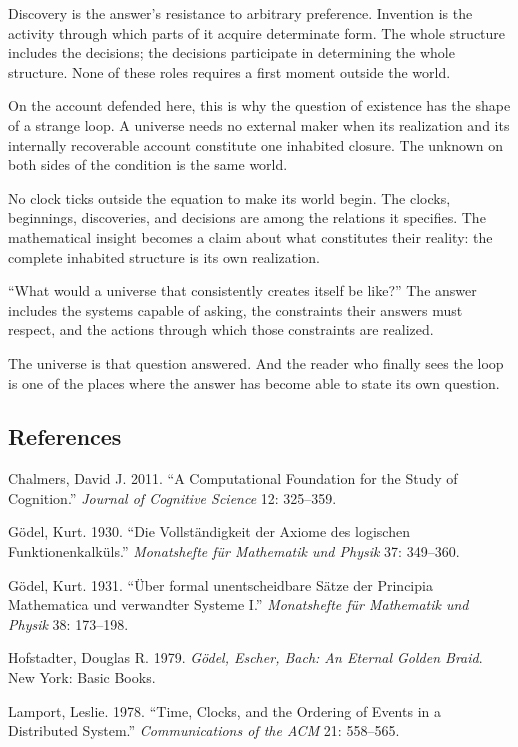 \documentclass[
  11pt,
]{article}
\begin{document}
Discovery is the answer's resistance to arbitrary preference. Invention
is the activity through which parts of it acquire determinate form. The
whole structure includes the decisions; the decisions participate in
determining the whole structure. None of these roles requires a first
moment outside the world.

On the account defended here, this is why the question of existence has
the shape of a strange loop. A universe needs no external maker when its
realization and its internally recoverable account constitute one
inhabited closure. The unknown on both sides of the condition is the
same world.

No clock ticks outside the equation to make its world begin. The clocks,
beginnings, discoveries, and decisions are among the relations it
specifies. The mathematical insight becomes a claim about what
constitutes their reality: the complete inhabited structure is
its own realization.

``What would a universe that consistently creates itself be like?'' The
answer includes the systems capable of asking, the constraints their
answers must respect, and the actions through which those constraints
are realized.

The universe is that question answered. And the reader who finally sees
the loop is one of the places where the answer has become able to state
its own question.

\subsection{References}\label{references}

Chalmers, David J. 2011. ``A Computational Foundation for the Study of
Cognition.'' \emph{Journal of Cognitive Science} 12: 325--359.

Gödel, Kurt. 1930. ``Die Vollständigkeit der Axiome des logischen
Funktionenkalküls.'' \emph{Monatshefte für Mathematik und Physik} 37:
349--360.

Gödel, Kurt. 1931. ``Über formal unentscheidbare Sätze der Principia
Mathematica und verwandter Systeme I.'' \emph{Monatshefte für Mathematik
und Physik} 38: 173--198.

Hofstadter, Douglas R. 1979. \emph{Gödel, Escher, Bach: An Eternal
Golden Braid}. New York: Basic Books.

Lamport, Leslie. 1978. ``Time, Clocks, and the Ordering of Events in a
Distributed System.'' \emph{Communications of the ACM} 21: 558--565.
\end{document}
